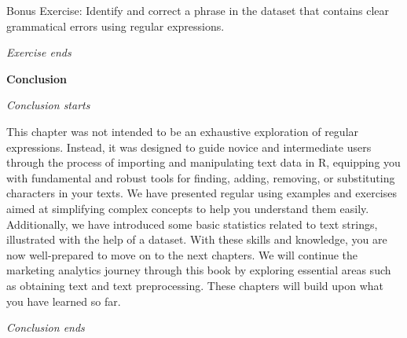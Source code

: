 Bonus Exercise: Identify and correct a phrase in the dataset that
contains clear grammatical errors using regular expressions.

\emph{Exercise ends}

\textbf{Conclusion}

\emph{Conclusion starts}

This chapter was not intended to be an exhaustive exploration of regular
expressions. Instead, it was designed to guide novice and intermediate
users through the process of importing and manipulating text data in R,
equipping you with fundamental and robust tools for finding, adding,
removing, or substituting characters in your texts. We have presented regular using examples and exercises aimed at
simplifying complex concepts to help you understand them easily. Additionally, we have
introduced some basic statistics related to text strings, illustrated
with the help of a dataset. With these skills and knowledge, you are now
well-prepared to move on to the next chapters. We will continue the
marketing analytics journey through this book by exploring essential
areas such as obtaining text and text preprocessing. These chapters will
build upon what you have learned so far.

\emph{Conclusion ends}